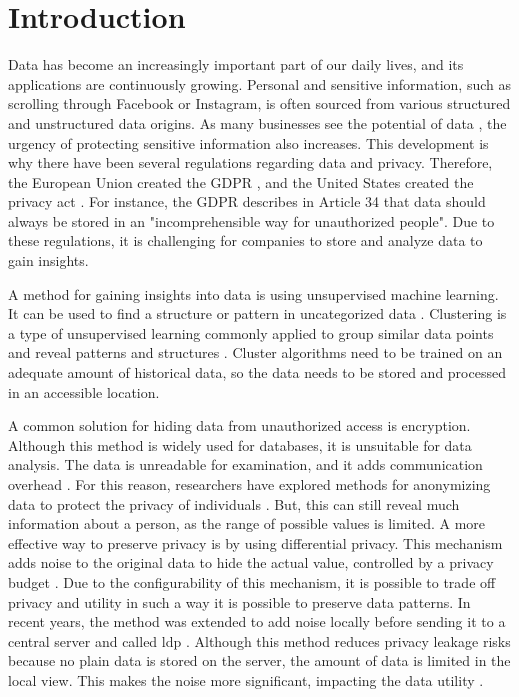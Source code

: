 \chapter{Introduction} \label{chapter:introduction}
Data has become an increasingly important part of our daily lives, and its applications are continuously growing.
Personal and sensitive information, such as scrolling through Facebook or Instagram, is often sourced from various structured and unstructured data origins.
As many businesses see the potential of data \citep{noauthor_global_nodate}, the urgency of protecting sensitive information also increases.
This development is why there have been several regulations regarding data and privacy. Therefore, the European Union created the GDPR \citep{noauthor_eur-lex_nodate}, and the United States created the privacy act \citep{division_privacy_2007}.
For instance, the GDPR describes in Article 34 that data should always be stored in an "incomprehensible way for unauthorized people".
Due to these regulations, it is challenging for companies to store and analyze data to gain insights.

A method for gaining insights into data is using unsupervised machine learning.
It can be used to find a structure or pattern in uncategorized data \citep{dridi_unsupervised_2021}.
Clustering is a type of unsupervised learning commonly applied to group similar data points and reveal patterns and structures \citep{dridi_unsupervised_2021}.
Cluster algorithms need to be trained on an adequate amount of historical data, so the data needs to be stored and processed in an accessible location.

A common solution for hiding data from unauthorized access is encryption.
Although this method is widely used for databases, it is unsuitable for data analysis.
The data is unreadable for examination, and it adds communication overhead \citep{liu_when_2022}.
For this reason, researchers have explored methods for anonymizing data to protect the privacy of individuals \citep{sweeney_k-anonymity_2002}.
But, this can still reveal much information about a person, as the range of possible values is limited.
A more effective way to preserve privacy is by using differential privacy.
This mechanism adds noise to the original data to hide the actual value, controlled by a privacy budget \citep{dwork_differential_2006}.
Due to the configurability of this mechanism, it is possible to trade off privacy and utility in such a way it is possible to preserve data patterns.
In recent years, the method was extended to add noise locally before sending it to a central server and called \gls{ldp} \citep{kasiviswanathan_what_2010}.
Although this method reduces privacy leakage risks because no plain data is stored on the server, the amount of data is limited in the local view.
This makes the noise more significant, impacting the data utility \citep{yang_local_2020}.

